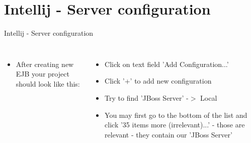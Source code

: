 \documentclass[aspectratio=1610,english]{beamer} %
\begin{document}
	\section{Intellij - Server configuration}
	\begin{frame}{Intellij - Server configuration}
		\begin{columns}
				\begin{itemize}
					\tiny
					\color{black}
					\item After creating new EJB your project should look like this:
				\end{itemize}
				
				\begin{minipage}{\textwidth}
				\end{minipage}
				
				\begin{itemize}
					\tiny
					\color{black}
					\item Click on text field 'Add Configuration...'
					\item Click '+' to add new configuration
					\item Try to find 'JBoss Server' -$>$ Local 
					\item You may first go to the bottom of the list and click '35 items more (irrelevant)...' - those are relevant - they contain our 'JBoss Server'
				\end{itemize}
				

\end{columns}
\end{frame}
\end{document}
